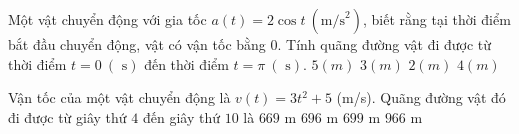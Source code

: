 \begin{ex}%
	Một vật chuyển động với gia tốc $a\left( t \right)=2\cos t~\left(\text{m/s}^2\right)$, biết rằng tại thời điểm bắt đầu chuyển động, vật có vận tốc bằng $0$. Tính quãng đường vật đi được từ thời điểm $t=0~\left( \text{  s} \right)$ đến thời điểm $t=\pi~\left( \text{ s} \right)$.
	\choice 
		{$5\left( m  \right)$}
		{$3\left( m  \right)$}
		{$2\left( m \right)$} 
		{\True $4\left( m  \right)$}
\end{ex}

\begin{ex}%
	Vận tốc của một vật chuyển động là $v(t) = 3t^2 +5$ (m/s). Quãng đường vật đó đi được từ giây thứ  $4$ đến giây thứ $10$ là
	\choice 
		 {$669$ m}
		{$696$ m} 
		 {$699$ m}
		{\True $966$ m} 
\end{ex}

